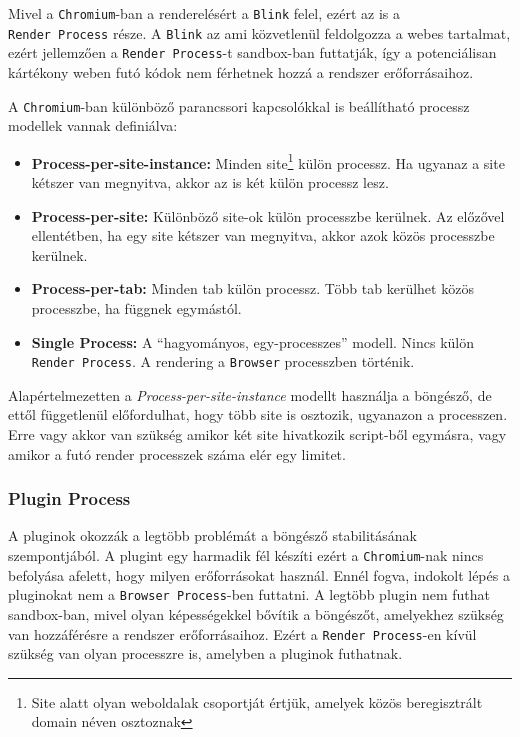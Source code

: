 \documentclass[12pt]{report}
\begin{document}
Mivel a \texttt{Chromium}-ban a renderelésért a \texttt{Blink} felel, ezért az is a \\
\texttt{Render Process} része. A \texttt{Blink} az ami közvetlenül feldolgozza a webes
tartalmat, ezért jellemzően a \texttt{Render Process}-t sandbox-ban futtatják, így a
potenciálisan kártékony weben futó kódok nem férhetnek hozzá a rendszer erőforrásaihoz.

A \texttt{Chromium}-ban különböző parancssori kapcsolókkal is beállítható processz modellek
vannak definiálva:
\begin{itemize}
    \item \textbf{Process-per-site-instance:}
        Minden site\footnote{Site alatt olyan weboldalak csoportját értjük, amelyek
        közös beregisztrált domain néven osztoznak} külön processz.
        Ha ugyanaz a site kétszer van megnyitva, akkor az is két külön processz lesz.
    \item \textbf{Process-per-site:}
        Különböző site-ok külön processzbe kerülnek. Az előzővel ellentétben, ha egy site
        kétszer van megnyitva, akkor azok közös processzbe kerülnek.
    \item \textbf{Process-per-tab:}
        Minden tab külön processz. Több tab kerülhet közös processzbe, ha függnek egymástól.
    \item \textbf{Single Process:}
        A ``hagyományos, egy-processzes'' modell. Nincs külön \texttt{Render Process}.
        A rendering a \texttt{Browser} processzben történik.
\end{itemize}

Alapértelmezetten a \textit{Process-per-site-instance} modellt használja a böngésző, de
ettől függetlenül előfordulhat, hogy több site is osztozik, ugyanazon a processzen.
Erre vagy akkor van szükség amikor két site hivatkozik script-ből egymásra,
vagy amikor a futó render processzek száma elér egy limitet.
\cite{bib-chromium-process-models}

\subsubsection{Plugin Process}
A pluginok okozzák a legtöbb problémát a böngésző stabilitásának szempontjából. A plugint
egy harmadik fél készíti ezért a \texttt{Chromium}-nak nincs befolyása afelett, hogy milyen
erőforrásokat használ. Ennél fogva, indokolt lépés a pluginokat nem a
\texttt{Browser Process}-ben futtatni. A legtöbb plugin nem futhat sandbox-ban, mivel olyan
képességekkel bővítik a böngészőt, amelyekhez szükség van hozzáférésre a rendszer
erőforrásaihoz. Ezért a \texttt{Render Process}-en kívül szükség van olyan processzre is,
amelyben a pluginok futhatnak.
\cite{bib-chromium-plugins}
\end{document}
